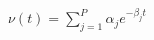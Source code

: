 \documentclass{article}
\begin{document}
$\nu (t) = \sum_{j = 1}^P \alpha_j e^{- \beta_j t}$
\end{document}
